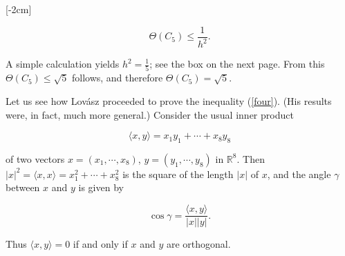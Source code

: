 \documentclass[12pt]{memoir}
\newcommand{\setsecondpagemargins}{
    \clearpage
    \setulmarginsandblock{2cm}{0.5cm}{*}
    \checkandfixthelayout
}
\begin{document}
[-2cm]

\begin{equation}
  \Theta(C_5) \leq \frac{1}{h^2}. \label{four}
\end{equation}

A simple calculation yields $h^2 = \frac{1}{5}$; see the box on the next page. From   
this $\Theta(C_5) \leq \sqrt{5}$ follows, and therefore $\Theta(C_5) = \sqrt{5}$.


\setsecondpagemargins

Let us see how Lov\'asz proceeded to prove the inequality (\ref{four}). (His results 
were, in fact, much more general.) Consider the usual inner product 

\begin{equation*}
  \langle x,y \rangle = x_1y_1 + \dotsb + x_8y_8
\end{equation*}

of two vectors $x = (x_1, \dotsb, x_8)$, $y = (y_1, \dotsb, y_8)$ in $\mathbb{R}^8$.
Then $|x|^2 = \langle x,x \rangle = x_1^2 + \dotsb + x_8^2$ is the square of the length $|x|$
of $x$, and the angle $\gamma$ between $x$ and $y$ is given by

\begin{equation*}
  \cos \gamma = \frac{\langle x,y \rangle}{|x||y|}.
\end{equation*}

Thus $\langle x,y \rangle = 0$ if and only if $x$ and $y$ are orthogonal.\\
\end{document}
